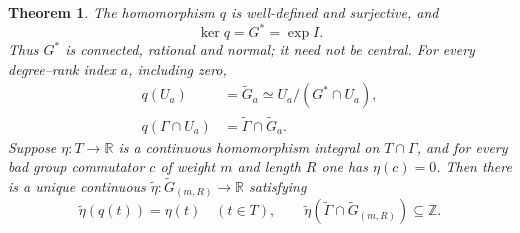 \documentclass[11pt]{article}
\newtheorem{theorem}{Theorem}
\newcommand{\R}{\mathbb R}\newcommand{\Q}{\mathbb Q}
\newcommand{\Z}{\mathbb Z}\newcommand{\N}{\mathbb N}
\begin{document}
\begin{theorem}\label{thm:quotient}
The homomorphism $q$ is well-defined and surjective, and
\[
 \ker q=G^*=\exp I.
\]
Thus $G^*$ is connected, rational and normal; it need not be central. For
every degree--rank index $a$, including zero,
\begin{align}
 q(U_a)&=\widetilde G_a\simeq U_a/(G^*\cap U_a),\label{eq:filteredquot}\\
 q(\Gamma\cap U_a)&=\widetilde\Gamma\cap\widetilde G_a.\label{eq:exactlattice}
\end{align}
Suppose $\eta:T\to\R$ is a continuous homomorphism integral on
$T\cap\Gamma$, and for every bad group commutator $c$ of weight $m$ and
length $R$ one has $\eta(c)=0$. Then there is a unique continuous
$\widetilde\eta:\widetilde G_{(m,R)}\to\R$ satisfying
\[
 \widetilde\eta(q(t))=\eta(t)\quad(t\in T),\qquad
 \widetilde\eta(\widetilde\Gamma\cap\widetilde G_{(m,R)})\subseteq\Z.
\]
\end{theorem}
\end{document}
